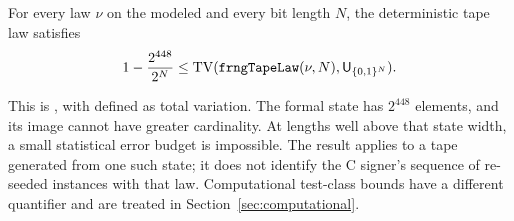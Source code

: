 \begin{theorem}\label{thm:routea}
For every law $\nu$ on the modeled  and every bit length
$N$, the deterministic tape law satisfies
\[
 1-\frac{2^{448}}{2^N}\leq
 \TV(\code{frngTapeLaw}(\nu,N),\U_{\{0,1\}^N}).
\]
\end{theorem}
This is , with
 defined as total variation. The formal state
has $2^{448}$ elements, and its image cannot have greater cardinality.
At lengths well above that state width, a small statistical error
budget is impossible. The result applies to a tape generated from one
such state; it does not identify the C signer's sequence of re-seeded
instances with that law. Computational test-class bounds have a
different quantifier and are treated in
Section~\ref{sec:computational}.
